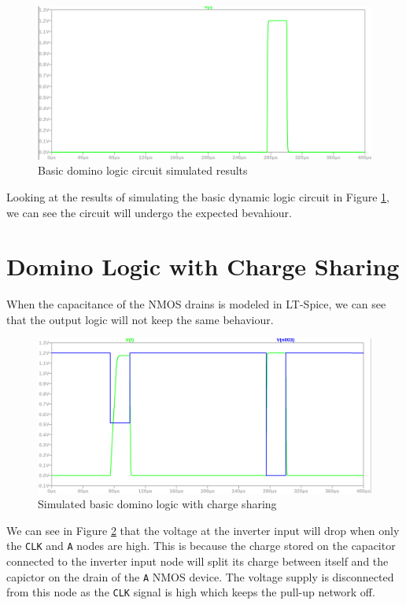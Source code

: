 \documentclass[CMPE]{../KGCOEReport}
\def\code#1{\texttt{#1}}
\begin{document}
    \begin{figure}[h!]
       \centering
       \includegraphics[width=5.5in]{img/basic_domino.png}
       \caption{Basic domino logic circuit simulated results}
       \label{fig:basic}
	 \end{figure}
	 
	 \pagebreak

	Looking at the results of simulating the basic dynamic logic circuit in Figure
	\ref{fig:basic}, we can see the circuit will undergo the expected bevahiour.

	\section*{Domino Logic with Charge Sharing}
	
	When the capacitance of the NMOS drains is modeled in LT-Spice, we can see that 
	the output logic will not keep the same behaviour.

	\begin{figure}[h!]
       \centering
       \includegraphics[width=5.5in]{img/basic_domino_charge_share.png}
       \caption{Simulated basic domino logic with charge sharing}
       \label{fig:charge_share}
	 \end{figure}

	We can see in Figure \ref{fig:charge_share} that the voltage at the inverter input
	will drop when only the \code{CLK} and \code{A} nodes are high. This is because the
	charge stored on the capacitor connected to the inverter input node will split its
	charge between itself and the capictor on the drain of the \code{A} NMOS device.
	The voltage supply is disconnected from this node as the \code{CLK} signal is high
	which keeps the pull-up network off.\\
\end{document}
